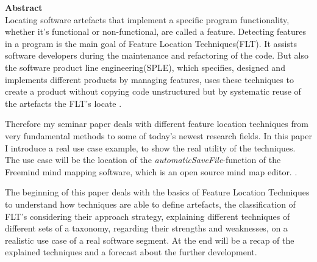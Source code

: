 \vspace*{2cm}

{\bf\Large Abstract} \\ [1em]
Locating software artefacts that implement a specific program functionality, whether it's functional or non-functional, are called a feature. Detecting features in a program is the main goal of Feature Location Techniques(FLT). It assists software developers during the maintenance and refactoring of the code.
But also the software product line engineering(SPLE), which specifies, designed and implements different products by managing features, uses these techniques to create a product without copying code unstructured but by systematic reuse of the artefacts the FLT's locate \cite{pohl2005software}.

Therefore my seminar paper deals with different feature location techniques from very fundamental methods to some of today's newest research fields. In this paper I introduce a real use case example, to show the real utility of the techniques. The use case will be the location of the \textit{automaticSaveFile}-function of the Freemind mind mapping software, which is an open source mind map editor. \cite{FrM16}.

The beginning of this paper deals with the basics of Feature Location Techniques to understand how techniques are able to define artefacts, the classification of FLT's considering their approach strategy, explaining different techniques of different sets of a taxonomy, regarding their strengths and weaknesses, on a realistic use case of a real software segment. At the end will be a recap of the explained techniques and a forecast about the further development.

\cleardoublepage
